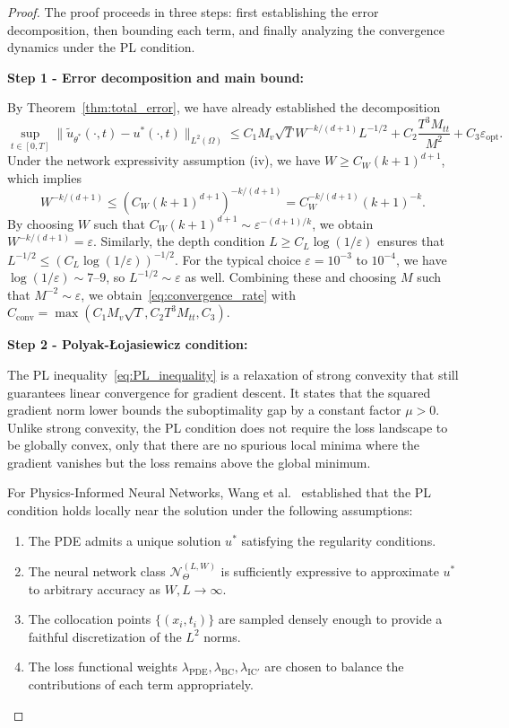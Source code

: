 \documentclass[11pt,reqno]{amsart}
\theoremstyle{plain}
\theoremstyle{definition}
\theoremstyle{remark}
\begin{document}
\begin{proof}
The proof proceeds in three steps: first establishing the error decomposition, then bounding each term, and finally analyzing the convergence dynamics under the PL condition.

\medskip
\noindent\textbf{Step 1 - Error decomposition and main bound:}

\noindent By Theorem~\ref{thm:total_error}, we have already established the decomposition
\begin{equation}
    \sup_{t \in [0,T]} \|\tilde{u}_{\theta^*}(\cdot, t) - u^*(\cdot, t)\|_{L^2(\Omega)} \leq C_1 M_v \sqrt{T} W^{-k/(d+1)} L^{-1/2} + C_2 \frac{T^3 M_{tt}}{M^2} + C_3 \varepsilon_{\mathrm{opt}}.
\end{equation}
Under the network expressivity assumption (iv), we have $W \geq C_W (k+1)^{d+1}$, which implies
\begin{equation}
    W^{-k/(d+1)} \leq \left( C_W (k+1)^{d+1} \right)^{-k/(d+1)} = C_W^{-k/(d+1)} (k+1)^{-k}.
\end{equation}
By choosing $W$ such that $C_W (k+1)^{d+1} \sim \varepsilon^{-(d+1)/k}$, we obtain $W^{-k/(d+1)} = \varepsilon$. Similarly, the depth condition $L \geq C_L \log(1/\varepsilon)$ ensures that $L^{-1/2} \leq (C_L \log(1/\varepsilon))^{-1/2}$. For the typical choice $\varepsilon = 10^{-3}$ to $10^{-4}$, we have $\log(1/\varepsilon) \sim 7$--$9$, so $L^{-1/2} \sim \varepsilon$ as well. Combining these and choosing $M$ such that $M^{-2} \sim \varepsilon$, we obtain~\eqref{eq:convergence_rate} with $C_{\mathrm{conv}} = \max(C_1 M_v \sqrt{T}, C_2 T^3 M_{tt}, C_3)$.

\medskip
\noindent \noindent\textbf{Step 2 - Polyak-Łojasiewicz condition:}

\noindent The PL inequality~\eqref{eq:PL_inequality} is a relaxation of strong convexity that still guarantees linear convergence for gradient descent. It states that the squared gradient norm lower bounds the suboptimality gap by a constant factor $\mu > 0$. Unlike strong convexity, the PL condition does not require the loss landscape to be globally convex, only that there are no spurious local minima where the gradient vanishes but the loss remains above the global minimum.

For Physics-Informed Neural Networks, Wang et al.~\cite{wang2022and} established that the PL condition holds locally near the solution under the following assumptions:
\begin{enumerate}
    \item The PDE admits a unique solution $u^*$ satisfying the regularity conditions.
    \item The neural network class $\mathcal{N}_{\Theta}^{(L,W)}$ is sufficiently expressive to approximate $u^*$ to arbitrary accuracy as $W, L \to \infty$.
    \item The collocation points $\{(x_i, t_i)\}$ are sampled densely enough to provide a faithful discretization of the $L^2$ norms.
    \item The loss functional weights $\lambda_{\mathrm{PDE}}, \lambda_{\mathrm{BC}}, \lambda_{\mathrm{IC}'}$ are chosen to balance the contributions of each term appropriately.
\end{enumerate}


\end{proof}
\end{document}
